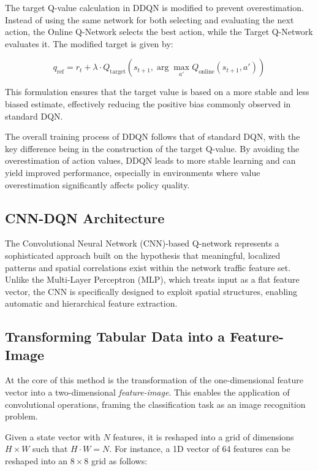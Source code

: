 \documentclass[12pt]{report}
\begin{document}
The target Q-value calculation in DDQN is modified to prevent overestimation. Instead of using the same network for both selecting and evaluating the next action, the Online Q-Network selects the best action, while the Target Q-Network evaluates it. The modified target is given by:

\[
q_{\text{ref}} = r_t + \lambda \cdot Q_{\text{target}}(s_{t+1}, \arg\max_{a'} Q_{\text{online}}(s_{t+1}, a'))
\]

This formulation ensures that the target value is based on a more stable and less biased estimate, effectively reducing the positive bias commonly observed in standard DQN.

The overall training process of DDQN follows that of standard DQN, with the key difference being in the construction of the target Q-value. By avoiding the overestimation of action values, DDQN leads to more stable learning and can yield improved performance, especially in environments where value overestimation significantly affects policy quality.

\subsection{CNN-DQN Architecture}

The Convolutional Neural Network (CNN)-based Q-network represents a sophisticated approach built on the hypothesis that meaningful, localized patterns and spatial correlations exist within the network traffic feature set. Unlike the Multi-Layer Perceptron (MLP), which treats input as a flat feature vector, the CNN is specifically designed to exploit spatial structures, enabling automatic and hierarchical feature extraction.

\subsection{Transforming Tabular Data into a Feature-Image}

At the core of this method is the transformation of the one-dimensional feature vector into a two-dimensional \textit{feature-image}. This enables the application of convolutional operations, framing the classification task as an image recognition problem.

Given a state vector with $N$ features, it is reshaped into a grid of dimensions $H \times W$ such that $H \cdot W = N$. For instance, a 1D vector of 64 features can be reshaped into an $8 \times 8$ grid as follows:
\end{document}
